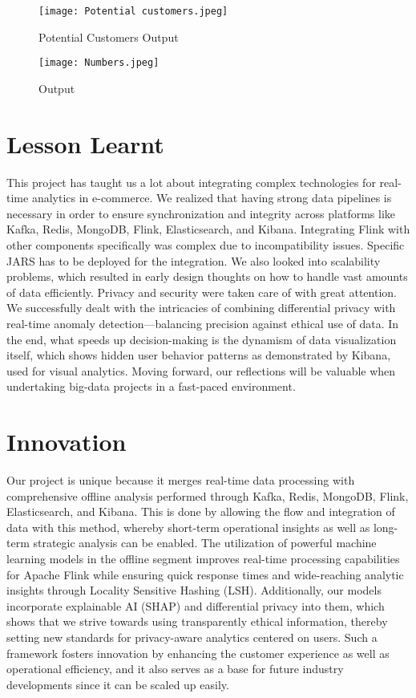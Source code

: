 \documentclass[conference]{IEEEtran}
\begin{document}
\begin{figure}[htbp]
\centerline{\texttt{[image: Potential customers.jpeg]}}
\caption{Potential Customers Output}
\label{fig}
\end{figure}

\begin{figure}[htbp]
\centerline{\texttt{[image: Numbers.jpeg]}}
\caption{Output}
\label{fig}
\end{figure}



\section{Lesson Learnt}
This project has taught us a lot about integrating complex technologies for real-time analytics in e-commerce. We realized that having strong data pipelines is necessary in order to ensure synchronization and integrity across platforms like Kafka, Redis, MongoDB, Flink, Elasticsearch, and Kibana. Integrating Flink with other components specifically was complex due to incompatibility issues. Specific JARS has to be deployed for the integration. We also looked into scalability problems, which resulted in early design thoughts on how to handle vast amounts of data efficiently. Privacy and security were taken care of with great attention. We successfully dealt with the intricacies of combining differential privacy with real-time anomaly detection—balancing precision against ethical use of data. In the end, what speeds up decision-making is the dynamism of data visualization itself, which shows hidden user behavior patterns as demonstrated by Kibana, used for visual analytics. Moving forward, our reflections will be valuable when undertaking big-data projects in a fast-paced environment.

\section{Innovation}
Our project is unique because it merges real-time data processing with comprehensive offline analysis performed through Kafka, Redis, MongoDB, Flink, Elasticsearch, and Kibana. This is done by allowing the flow and integration of data with this method, whereby short-term operational insights as well as long-term strategic analysis can be enabled. The utilization of powerful machine learning models in the offline segment improves real-time processing capabilities for Apache Flink while ensuring quick response times and wide-reaching analytic insights through Locality Sensitive Hashing (LSH). Additionally, our models incorporate explainable AI (SHAP) and differential privacy into them, which shows that we strive towards using transparently ethical information, thereby setting new standards for privacy-aware analytics centered on users. Such a framework fosters innovation by enhancing the customer experience as well as operational efficiency, and it also serves as a base for future industry developments since it can be scaled up easily.
\end{document}
